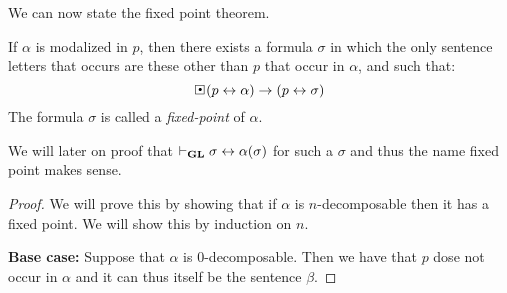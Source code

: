 \documentclass[../main.tex]{subfiles}
\begin{document}
We can now state the fixed point theorem.
\begin{thm}
	\label{thm:Fixed}
	If $\alpha$ is modalized in $p$, then there exists a formula $\sigma$
	in which the only sentence letters that occurs are these other than $p$
	that occur in $\alpha$, and such that:
	\[\sBox(p\leftrightarrow\alpha)\rightarrow(p\leftrightarrow\sigma)\]
	The formula $\sigma$ is called a \textit{fixed-point} of $\alpha$.
\end{thm}
We will later on proof that $\vdash_{\text{\textbf{GL}}}\sigma\leftrightarrow\alpha(\sigma)$ for
such a $\sigma$ and thus the name fixed point makes sense.
\begin{proof}
	We will prove this by showing that if $\alpha$ is $n$-decomposable
	then it has a fixed point. We will show this by induction on $n$.

	\textbf{Base case:} Suppose that $\alpha$ is $0$-decomposable. Then we
	have that $p$ dose not occur in $\alpha$ and it can thus itself be the
	sentence $\beta$.


\end{proof}
\end{document}
